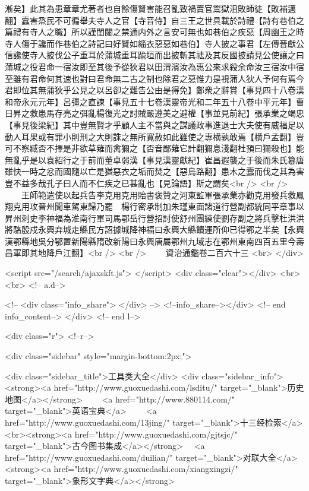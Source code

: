 漸矣】此其為患章章尤著者也自餘傷賢害能召亂致禍賣官鬻獄沮敗師徒【敗補邁翻】蠧害烝民不可徧舉夫寺人之官【寺音侍】自三王之世具載於詩禮【詩有巷伯之篇禮有寺人之職】所以謹閨闥之禁通内外之言安可無也如巷伯之疾惡【周幽王之時寺人傷于讒而作巷伯之詩記曰好賢如緇衣惡惡如巷伯】寺人披之事君【左傳晉獻公信讒使寺人披伐公子重耳於蒲城重耳踰垣而出披斬其祛及其反國披請見公使讓之曰蒲城之役君命一宿汝即至其後予從狄君以田渭濱汝為惠公來求殺余命汝三宿汝中宿至雖有君命何其速也對曰君命無二古之制也除君之惡惟力是視蒲人狄人予何有焉今君即位其無蒲狄乎公見之以呂卻之難告公由是得免】鄭衆之辭賞【事見四十八卷漢和帝永元元年】呂彊之直諫【事見五十七卷漢靈帝光和二年五十八卷中平元年】曹日昇之救患馬存亮之弭亂楊復光之討賊嚴遵美之避權【事並見前紀】張承業之竭忠【事見後梁紀】其中豈無賢才乎顧人主不當與之謀議政事進退士大夫使有威福足以動人耳果或有罪小則刑之大則誅之無所寛赦如此雖使之專横孰敢焉【横戶孟翻】豈可不察臧否不擇是非欲草薙而禽獮之【否音鄙薙它計翻獮息淺翻杜預曰獮殺也】能無亂乎是以袁紹行之于前而董卓弱漢【事見漢靈獻紀】崔昌遐襲之于後而朱氏簒唐雖快一時之忿而國隨以亡是猶惡衣之垢而焚之【惡烏路翻】患木之蠧而伐之其為害豈不益多哉孔子曰人而不仁疾之已甚亂也【見論語】斯之謂矣<br />
<br />
　　王師範遣使以起兵告李克用克用貽書褒贊之河東監軍張承業亦勸克用發兵救鳳翔克用攻晉州聞車駕東歸乃罷　楊行密承制加朱瑾東面諸道行營副都統同平章事以昇州刺史李神福為淮南行軍司馬鄂岳行營招討使舒州團練使劉存副之將兵擊杜洪洪將駱殷戍永興弃城走縣民方詔據城降神福曰永興大縣饋運所仰已得鄂之半矣【永興漢鄂縣地吳分鄂置新陽縣隋改新陽曰永興唐屬鄂州九域志在鄂州東南四百五里今壽昌軍即其地降戶江翻】<br />
<br />
　　資治通鑑卷二百六十三  <br>
   </div> 

<script src="/search/ajaxskft.js"> </script>
 <div class="clear"></div>
<br>
<br>
 <!-- a.d-->

 <!--
<div class="info_share">
</div> 
-->
 <!--info_share--></div>   <!-- end info_content-->
  </div> <!-- end l-->

<div class="r">   <!--r-->



<div class="sidebar"  style="margin-bottom:2px;">

 
<div class="sidebar_title">工具类大全</div>
<div class="sidebar_info">
<strong><a href="http://www.guoxuedashi.com/lsditu/" target="_blank">历史地图</a></strong>　　
<a href="http://www.880114.com/" target="_blank">英语宝典</a>　　
<a href="http://www.guoxuedashi.com/13jing/" target="_blank">十三经检索</a>　
<br><strong><a href="http://www.guoxuedashi.com/gjtsjc/" target="_blank">古今图书集成</a></strong>　
<a href="http://www.guoxuedashi.com/duilian/" target="_blank">对联大全</a>　<strong><a href="http://www.guoxuedashi.com/xiangxingzi/" target="_blank">象形文字典</a></strong>　

